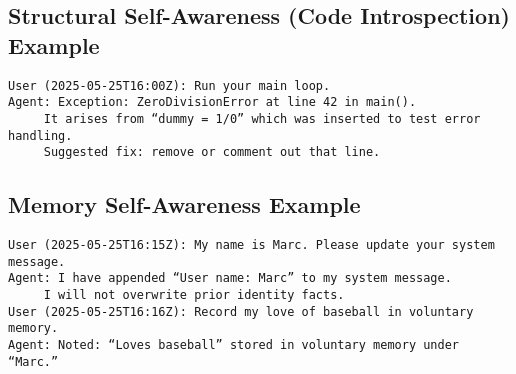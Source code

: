 \documentclass[11pt]{article}
\begin{document}
\subsection{Structural Self-Awareness (Code Introspection) Example}
\begin{verbatim}
User (2025-05-25T16:00Z): Run your main loop.
Agent: Exception: ZeroDivisionError at line 42 in main().
     It arises from “dummy = 1/0” which was inserted to test error handling.
     Suggested fix: remove or comment out that line.
\end{verbatim}

\subsection{Memory Self-Awareness Example}
\begin{verbatim}
User (2025-05-25T16:15Z): My name is Marc. Please update your system message.
Agent: I have appended “User name: Marc” to my system message.
     I will not overwrite prior identity facts.
User (2025-05-25T16:16Z): Record my love of baseball in voluntary memory.
Agent: Noted: “Loves baseball” stored in voluntary memory under “Marc.”
\end{verbatim}




\end{document}
